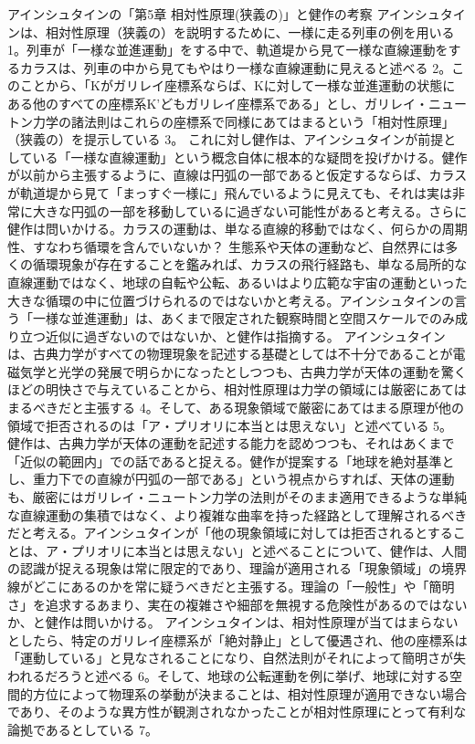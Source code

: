 \documentclass{article}
\begin{document}
アインシュタインの「第5章 相対性原理(狭義の)」と健作の考察
アインシュタインは、相対性原理（狭義の）を説明するために、一様に走る列車の例を用いる 1。列車が「一様な並進運動」をする中で、軌道堤から見て一様な直線運動をするカラスは、列車の中から見てもやはり一様な直線運動に見えると述べる 2。このことから、「Kがガリレイ座標系ならば、Kに対して一様な並進運動の状態にある他のすべての座標系K'どもガリレイ座標系である」とし、ガリレイ・ニュートン力学の諸法則はこれらの座標系で同様にあてはまるという「相対性原理」（狭義の）を提示している 3。
これに対し健作は、アインシュタインが前提としている「一様な直線運動」という概念自体に根本的な疑問を投げかける。健作が以前から主張するように、直線は円弧の一部であると仮定するならば、カラスが軌道堤から見て「まっすぐ一様に」飛んでいるように見えても、それは実は非常に大きな円弧の一部を移動しているに過ぎない可能性があると考える。さらに健作は問いかける。カラスの運動は、単なる直線的移動ではなく、何らかの周期性、すなわち循環を含んでいないか？ 生態系や天体の運動など、自然界には多くの循環現象が存在することを鑑みれば、カラスの飛行経路も、単なる局所的な直線運動ではなく、地球の自転や公転、あるいはより広範な宇宙の運動といった大きな循環の中に位置づけられるのではないかと考える。アインシュタインの言う「一様な並進運動」は、あくまで限定された観察時間と空間スケールでのみ成り立つ近似に過ぎないのではないか、と健作は指摘する。
アインシュタインは、古典力学がすべての物理現象を記述する基礎としては不十分であることが電磁気学と光学の発展で明らかになったとしつつも、古典力学が天体の運動を驚くほどの明快さで与えていることから、相対性原理は力学の領域には厳密にあてはまるべきだと主張する 4。そして、ある現象領域で厳密にあてはまる原理が他の領域で拒否されるのは「ア・プリオリに本当とは思えない」と述べている 5。
健作は、古典力学が天体の運動を記述する能力を認めつつも、それはあくまで「近似の範囲内」での話であると捉える。健作が提案する「地球を絶対基準とし、重力下での直線が円弧の一部である」という視点からすれば、天体の運動も、厳密にはガリレイ・ニュートン力学の法則がそのまま適用できるような単純な直線運動の集積ではなく、より複雑な曲率を持った経路として理解されるべきだと考える。アインシュタインが「他の現象領域に対しては拒否されるとすることは、ア・プリオリに本当とは思えない」と述べることについて、健作は、人間の認識が捉える現象は常に限定的であり、理論が適用される「現象領域」の境界線がどこにあるのかを常に疑うべきだと主張する。理論の「一般性」や「簡明さ」を追求するあまり、実在の複雑さや細部を無視する危険性があるのではないか、と健作は問いかける。
アインシュタインは、相対性原理が当てはまらないとしたら、特定のガリレイ座標系が「絶対静止」として優遇され、他の座標系は「運動している」と見なされることになり、自然法則がそれによって簡明さが失われるだろうと述べる 6。そして、地球の公転運動を例に挙げ、地球に対する空間的方位によって物理系の挙動が決まることは、相対性原理が適用できない場合であり、そのような異方性が観測されなかったことが相対性原理にとって有利な論拠であるとしている 7。
\end{document}

